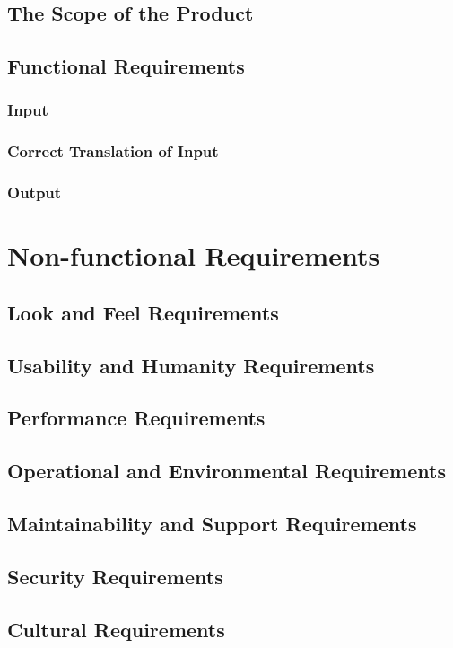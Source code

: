 \documentclass[12pt]{report}
\begin{document}
\section{The Scope of the Product}\label{sec:ScopeOfProduct}
\section{Functional Requirements}\label{sec:Functional}
\subsection{Input}
\subsection{Correct Translation of Input}
\subsection{Output}

\chapter{Non-functional Requirements}\label{ch:NonFunc}
\section{Look and Feel Requirements}\label{sec:LookAndFeel} 
\section{Usability and Humanity Requirements}\label{sec:Usability}
\section{Performance Requirements}\label{sec:Performance}
\section{Operational and Environmental Requirements}\label{sec:Operational}
\section{Maintainability and Support Requirements}\label{sec:Support}
\section{Security Requirements}\label{sec:Security}
\section{Cultural Requirements}\label{sec:Cultural}
\end{document}

